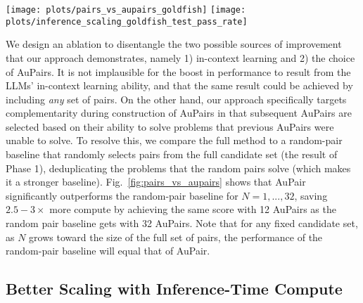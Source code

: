 \documentclass[11pt, a4paper, logo, copyright]{googledeepmind}
\def\aupair/{\textcolor{golden}{Au}Pair}
\def\aupairs/{\textcolor{golden}{Au}Pairs}
\begin{document}
\begin{figure*}
    \centering
    \texttt{[image: plots/pairs\_vs\_aupairs\_goldfish]}
    \texttt{[image: plots/inference\_scaling\_goldfish\_test\_pass\_rate]}
    \caption{\textbf{(a) \aupairs/ vs. random pairs}: \aupairs/ (green) are significantly (about $2.5-3\times$) more compute-efficient than random pairs (red); it takes only 12 \aupairs/ to reach the same performance as 32 random pairs; \textbf{(b) Scaling inference-time compute:} using \aupairs/ the score increases with compute budget at a much steeper rate compared to baselines (CodeForces dataset, Gemini-1.5-Pro).
    }
    \label{fig:pairs_vs_aupairs}
\end{figure*}

We design an ablation to disentangle the two possible sources of improvement that our approach demonstrates, namely 1) in-context learning and 2) the choice of \aupairs/. It is not implausible for the boost in performance to result from the LLMs' in-context learning ability, and that the same result could be achieved by including \emph{any} set of pairs. On the other hand, our approach specifically targets complementarity during construction of \aupairs/ in that subsequent \aupairs/ are selected based on their ability to solve problems that previous \aupairs/ were unable to solve. To resolve this, we compare the full method to a random-pair baseline that randomly selects pairs from the full candidate set (the result of Phase 1), deduplicating the problems that the random pairs solve (which makes it a stronger baseline). Fig.~\ref{fig:pairs_vs_aupairs} shows that \aupair/ significantly outperforms the random-pair baseline for $N = 1, ..., 32$, saving $2.5-3\times$ more compute by achieving the same score with 12 \aupairs/ as the random pair baseline gets with 32 \aupairs/. Note that for any fixed candidate set, as $N$ grows toward the size of the full set of pairs, the performance of the random-pair baseline will equal that of \aupair/.


\subsection{Better Scaling with Inference-Time Compute}
\label{sec:inference_compute_scaling}
\end{document}
